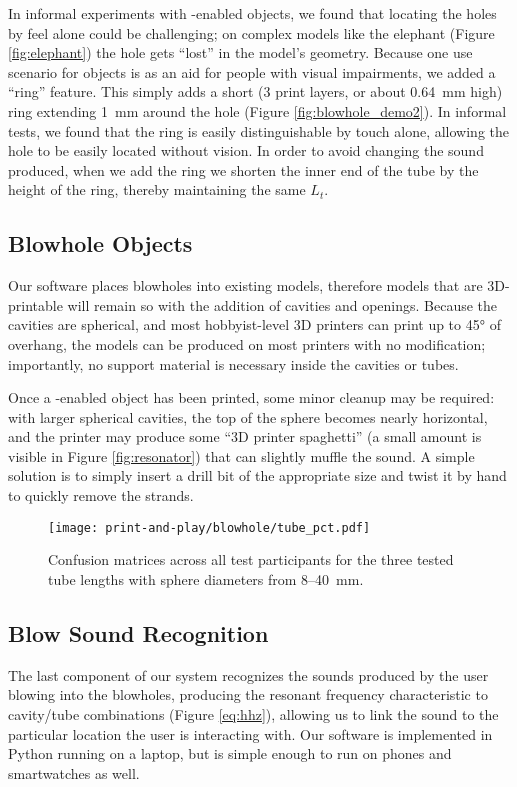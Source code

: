       In informal experiments with \bh-enabled objects, we found that locating
      the holes by feel alone could be challenging; on complex models like the
      elephant (Figure \ref{fig:elephant}) the hole gets ``lost'' in the model's
      geometry. Because one use scenario for \bh objects is as an aid for people
      with visual impairments, we added a ``ring'' feature. This simply adds a
      short (3 print layers, or about 0.64~mm high) ring extending 1~mm around
      the hole (Figure \ref{fig:blowhole_demo2}). In informal tests, we found
      that the ring is easily distinguishable by touch alone, allowing the hole
      to be easily located without vision. In order to avoid changing the sound
      produced, when we add the ring we shorten the inner end of the tube by the
      height of the ring, thereby maintaining the same $L_t$.
      
    \subsection{Blowhole Objects} 
      Our software places blowholes into existing models, therefore models that
      are 3D-printable will remain so with the addition of cavities and
      openings. Because the cavities are spherical, and most hobbyist-level 3D
      printers can print up to 45° of overhang, the models can be produced
      on most printers with no modification; importantly, no support material is
      necessary inside the cavities or tubes.
          
      Once a \bh-enabled object has been printed, some minor cleanup may be
      required: with larger spherical cavities, the top of the sphere becomes
      nearly horizontal, and the printer may produce some ``3D printer
      spaghetti'' (a small amount is visible in Figure \ref{fig:resonator}) that
      can slightly muffle the sound. A simple solution is to simply insert a
      drill bit of the appropriate size and twist it by hand to quickly remove
      the strands. 
          
      \begin{figure*}[t]
        \centering
        \texttt{[image: print-and-play/blowhole/tube\_pct.pdf]}
        \caption{Confusion matrices across all test participants for the three
          tested tube lengths with sphere diameters from 8--40~mm.}
        \label{fig:confusion}
      \end{figure*}
          
    \subsection{Blow Sound Recognition}
      The last component of our system recognizes the sounds produced by the
      user blowing into the blowholes, producing the resonant frequency
      characteristic to cavity/tube combinations (Figure \ref{eq:hhz}), allowing
      us to link the sound to the particular location the user is interacting
      with.  Our software is implemented in Python running on a laptop, but is
      simple enough to run on phones and smartwatches as well.

